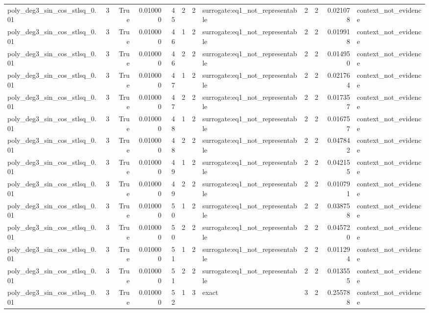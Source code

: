 \begin{tabular}{lrrrrrrlrrrl}
poly\_deg3\_sin\_cos\_stlsq\_0.01 & 3 & True & 0.010000 & 45 & 2 & 2 & surrogate:eq1\_not\_representable & 2 & 2 & 0.021078 & context\_not\_evidence \\
poly\_deg3\_sin\_cos\_stlsq\_0.01 & 3 & True & 0.010000 & 46 & 1 & 2 & surrogate:eq1\_not\_representable & 2 & 2 & 0.019918 & context\_not\_evidence \\
poly\_deg3\_sin\_cos\_stlsq\_0.01 & 3 & True & 0.010000 & 46 & 2 & 2 & surrogate:eq1\_not\_representable & 2 & 2 & 0.014950 & context\_not\_evidence \\
poly\_deg3\_sin\_cos\_stlsq\_0.01 & 3 & True & 0.010000 & 47 & 1 & 2 & surrogate:eq1\_not\_representable & 2 & 2 & 0.021764 & context\_not\_evidence \\
poly\_deg3\_sin\_cos\_stlsq\_0.01 & 3 & True & 0.010000 & 47 & 2 & 2 & surrogate:eq1\_not\_representable & 2 & 2 & 0.017357 & context\_not\_evidence \\
poly\_deg3\_sin\_cos\_stlsq\_0.01 & 3 & True & 0.010000 & 48 & 1 & 2 & surrogate:eq1\_not\_representable & 2 & 2 & 0.016757 & context\_not\_evidence \\
poly\_deg3\_sin\_cos\_stlsq\_0.01 & 3 & True & 0.010000 & 48 & 2 & 2 & surrogate:eq1\_not\_representable & 2 & 2 & 0.047842 & context\_not\_evidence \\
poly\_deg3\_sin\_cos\_stlsq\_0.01 & 3 & True & 0.010000 & 49 & 1 & 2 & surrogate:eq1\_not\_representable & 2 & 2 & 0.042155 & context\_not\_evidence \\
poly\_deg3\_sin\_cos\_stlsq\_0.01 & 3 & True & 0.010000 & 49 & 2 & 2 & surrogate:eq1\_not\_representable & 2 & 2 & 0.010791 & context\_not\_evidence \\
poly\_deg3\_sin\_cos\_stlsq\_0.01 & 3 & True & 0.010000 & 50 & 1 & 2 & surrogate:eq1\_not\_representable & 2 & 2 & 0.038758 & context\_not\_evidence \\
poly\_deg3\_sin\_cos\_stlsq\_0.01 & 3 & True & 0.010000 & 50 & 2 & 2 & surrogate:eq1\_not\_representable & 2 & 2 & 0.045720 & context\_not\_evidence \\
poly\_deg3\_sin\_cos\_stlsq\_0.01 & 3 & True & 0.010000 & 51 & 1 & 2 & surrogate:eq1\_not\_representable & 2 & 2 & 0.011294 & context\_not\_evidence \\
poly\_deg3\_sin\_cos\_stlsq\_0.01 & 3 & True & 0.010000 & 51 & 2 & 2 & surrogate:eq1\_not\_representable & 2 & 2 & 0.013555 & context\_not\_evidence \\
poly\_deg3\_sin\_cos\_stlsq\_0.01 & 3 & True & 0.010000 & 52 & 1 & 3 & exact & 3 & 2 & 0.255788 & context\_not\_evidence \\

\end{tabular}
